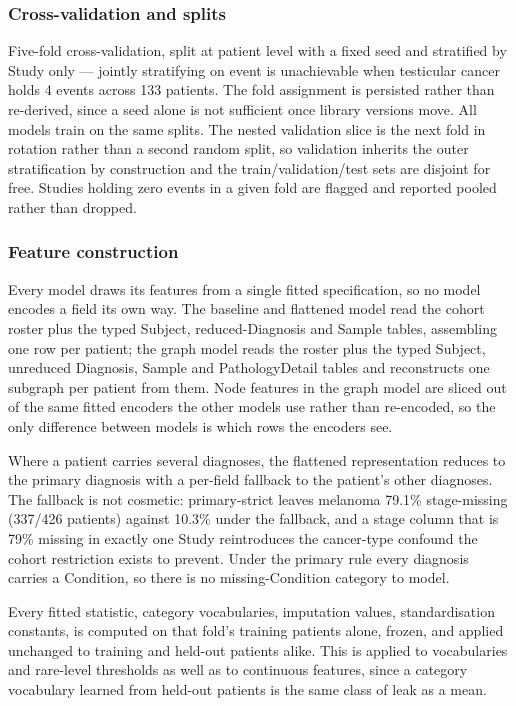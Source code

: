 \subsubsection{Cross-validation and splits}

Five-fold cross-validation, split at patient level with a fixed seed and stratified by Study only --- jointly stratifying on event is unachievable when testicular cancer holds 4 events across 133 patients. The fold assignment is persisted rather than re-derived, since a seed alone is not sufficient once library versions move. All models train on the same splits. The nested validation slice is the next fold in rotation rather than a second random split, so validation inherits the outer stratification by construction and the train/validation/test sets are disjoint for free. Studies holding zero events in a given fold are flagged and reported pooled rather than dropped.

\subsubsection{Feature construction}

Every model draws its features from a single fitted specification, so no model encodes a field its own way. The baseline and flattened model read the cohort roster plus the typed Subject, reduced-Diagnosis and Sample tables, assembling one row per patient; the graph model reads the roster plus the typed Subject, unreduced Diagnosis, Sample and PathologyDetail tables and reconstructs one subgraph per patient from them. Node features in the graph model are sliced out of the same fitted encoders the other models use rather than re-encoded, so the only difference between models is which rows the encoders see.

Where a patient carries several diagnoses, the flattened representation reduces to the primary diagnosis with a per-field fallback to the patient's other diagnoses. The fallback is not cosmetic: primary-strict leaves melanoma 79.1\% stage-missing (337/426 patients) against 10.3\% under the fallback, and a stage column that is 79\% missing in exactly one Study reintroduces the cancer-type confound the cohort restriction exists to prevent. Under the primary rule every diagnosis carries a Condition, so there is no missing-Condition category to model.

Every fitted statistic, category vocabularies, imputation values, standardisation constants, is computed on that fold's training patients alone, frozen, and applied unchanged to training and held-out patients alike. This is applied to vocabularies and rare-level thresholds as well as to continuous features, since a category vocabulary learned from held-out patients is the same class of leak as a mean.

